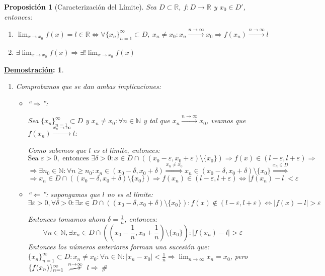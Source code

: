 \documentclass[10pt,a4paper,openright]{book}
\theoremstyle{break}
\newtheorem*{prop}{Proposición}
\newtheorem*{demo}{\underline{Demostración}:}
\begin{document}
\begin{prop}[Caracterización del Límite]
Sea $D\subset \mathbb R$, $f:D\longrightarrow \mathbb R$ y $x_0\in D'$, entonces:
\begin{enumerate}
\item $\lim_{x\rightarrow x_0} f(x)=l\in \mathbb R \Leftrightarrow \forall \{x_n\}_{n=1}^\infty\subset D, \ x_n\neq x_0: x_n\xrightarrow{n\rightarrow \infty} x_0\Rightarrow 	f(x_n)\xrightarrow{n\rightarrow \infty} l$

\item $\exists \lim_{x\rightarrow x_0} f(x)\Rightarrow \exists! \lim_{x\rightarrow x_0} f(x)$
\end{enumerate}
\end{prop}
\begin{demo}
\begin{enumerate}
\item Comprobamos que se dan ambas implicaciones:
	\begin{itemize}
	\item ``$\Rightarrow$'': \par
	Sea $\{x_n\}_{n=1}^\infty\subset D$ y $x_n\neq x_0: \forall n\in \mathbb N$ y tal que $x_n\xrightarrow{n\rightarrow \infty} x_0$, veamos que $f(x_n)\xrightarrow{x_n\rightarrow \infty} l$:
	
	Como sabemos que $l$ es el límite, entonces:
	$$\mbox{Sea }\varepsilon>0,\mbox{ entonces } \exists \delta >0: x\in D\cap \left((x_0-\varepsilon, x_0+\varepsilon)\mbox{\textbackslash} \{x_0\}\right)\Rightarrow f(x)\in (l-\varepsilon, l+\varepsilon)\Rightarrow$$
	$$\Rightarrow \exists n_0\in \mathbb N: \forall n\geq n_0: x_n \in (x_0-\delta, x_0+\delta)\stackrel{x_n\neq x_0}{\Rightarrow}x_n \in (x_0-\delta, x_0+\delta)\mbox{\textbackslash}\{x_0\}\stackrel{x_n\in D}{\Rightarrow}$$
	$$\Rightarrow  x_n \in D\cap\left((x_0-\delta, x_0+\delta)\mbox{\textbackslash}\{x_0\}\right)\Rightarrow f(x_n)\in (l-\varepsilon, l+\varepsilon)\Leftrightarrow |f(x_n)-l|<\varepsilon$$
	
	\item ``$\Leftarrow$'': supongamos que $l$ no es el límite:
	$$\exists \varepsilon>0, \forall \delta>0: \exists x\in D\cap \left((x_0-\delta, x_0+\delta)\mbox{\textbackslash} \{x_0\}\right): f(x)\notin (l-\varepsilon, l+\varepsilon)\Leftrightarrow |f(x)-l|>\varepsilon$$
	
	Entonces tomamos ahora $\delta=\frac{1}{n}$, entonces:
	$$\forall n\in \mathbb N, \exists x_n\in D\cap \left((x_0-\frac{1}{n}, x_0+\frac{1}{n})\mbox{\textbackslash} \{x_0\}\right): |f(x_n)-l|>\varepsilon$$
	Entonces los números anteriores forman una sucesión que: $\{x_n\}_{n=1}^\infty\subset D: x_n\neq x_0: \forall n\in \mathbb N: |x_n-x_0|<\frac{1}{n}\Rightarrow \lim_{n\rightarrow\infty} x_n=x_0$, pero $\{f(x_n)\}_{n=1}^\infty \mbox{ }\stackrel{n\rightarrow\infty}{\cancel{\longrightarrow}}\mbox{ } l\Rightarrow$ \#	
	\end{itemize}
	

\end{enumerate}
\end{demo}
\end{document}
